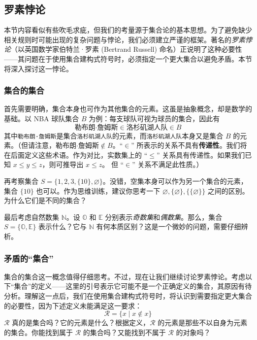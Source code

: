 \subsection{罗素悖论}\label{sec:section3.3.5}

本节内容看似有些吹毛求疵，但我们的考量源于集合论的基本思想。为了避免缺少相关规则时可能出现的复杂问题与悖论，我们必须建立严谨的框架。著名的\emph{罗素悖论}（以英国数学家伯特兰·罗素 (Bertrand Russell) 命名）正说明了这种必要性——其问题在于使用集合建构式符号时，必须指定一个更大集合以避免矛盾。本节将深入探讨这一悖论。

\subsubsection*{集合的集合}

首先需要明确，集合本身也可作为其他集合的元素。这虽是抽象概念，却是数学的基础。以 NBA 球队集合 $B$ 为例：每支球队可视为球员的集合，因此有
\[\text{勒布朗·詹姆斯} \in \text{洛杉矶湖人队} \in B\]
其中\verb|勒布朗·詹姆斯|是集合\verb|洛杉矶湖人队|的元素，而\verb|洛杉矶湖人队|本身又是集合 $B$ 的元素。（但请注意，$\text{勒布朗·詹姆斯} \notin B$。``$\in$'' 所表示的关系不具有\textbf{传递性}。我们将在后面定义这些术语。作为对比，实数集上的 ``$\le$'' 关系具有传递性。如果我们已知 $x \le y \le z$，则可推导出 $x \le z$。 但 ``$\in$'' 关系不满足此性质。）

再考察集合 $S = \{1, 2, 3, \{10\}, \varnothing \}$。没错，空集本身可以作为另一个集合的元素，集合 $\{10\}$ 也可以。作为思维训练，建议你思考一下 $\varnothing, \{\varnothing\}, \{\{\varnothing\}\}$ 之间的区别。为什么它们是不同的集合？

最后考虑自然数集 $\mathbb{N}$。设 $\mathbb{O}$ 和 $\mathbb{E}$ 分别表示\emph{奇数集}和\emph{偶数集}。那么，集合 $S = \{\mathbb{O}, \mathbb{E}\}$ 表示什么？它与 $\mathbb{N}$ 有何本质区别？这是一个微妙的问题，需要仔细辨析。

\subsubsection*{矛盾的``集合''}

集合的集合这一概念值得仔细思考。不过，现在让我们继续讨论罗素悖论。考虑以下``集合''的定义——这里的引号表示它可能不是一个正确定义的集合，其原因有待分析。理解这一点后，我们在使用集合建构式符号时，将认识到需要指定更大集合的必要性，因为下述定义未能满足这一要求：
\[\mathcal{R} = \{x \mid x \notin x\}\]
$\mathcal{R}$ 真的是集合吗？它的元素是什么？根据定义，$\mathcal{R}$ 的元素是那些不以自身为元素的集合。你能找到属于 $\mathcal{R}$ 的集合吗？又能找到不属于 $\mathcal{R}$ 的对象吗？

